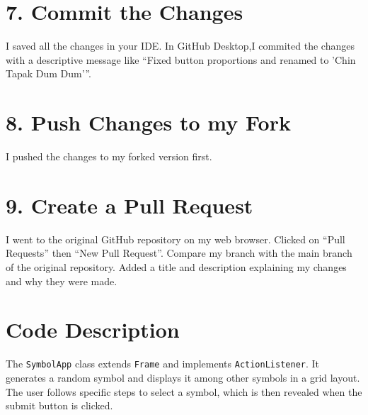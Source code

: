 \documentclass[12pt, a4paper]{article}
\begin{document}
\section*{ 7. Commit the Changes}
I saved all the changes in your IDE.
In GitHub Desktop,I commited the changes with a descriptive message like “Fixed button proportions and renamed to 'Chin Tapak Dum Dum'”.

\section*{ 8. Push Changes to my Fork}
I pushed the changes to my forked version first.

\section*{9. Create a Pull Request}
I went to the original GitHub repository on my web browser.
Clicked on “Pull Requests” then “New Pull Request”.
Compare my branch with the main branch of the original repository.
Added a title and description explaining my changes and why they were made.
\section*{Code Description}
The \texttt{SymbolApp} class extends \texttt{Frame} and implements \texttt{ActionListener}. It generates a random symbol and displays it among other symbols in a grid layout. The user follows specific steps to select a symbol, which is then revealed when the submit button is clicked.
\end{document}
